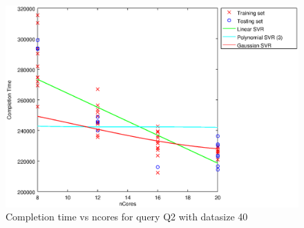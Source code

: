 
\begin {figure}[hbtp]
\centering
\includegraphics[width=\textwidth]{output/Q2_40_ALL_FEATURES/plot_Q2_40_bestmodels.eps}
\caption{Completion time vs ncores for query Q2 with datasize 40}
\label{fig:all_linear_Q2_40}
\end {figure}
